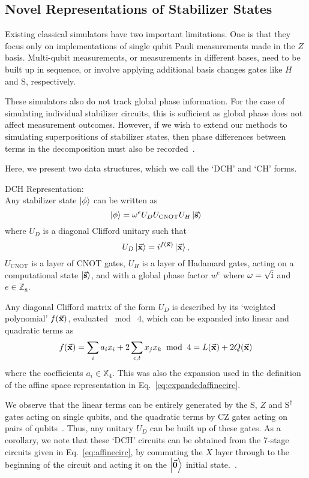 \subsection{Novel Representations of Stabilizer States}
Existing classical simulators have two important limitations. One is that they focus only on implementations of single qubit Pauli measurements made in the $Z$ basis. Multi-qubit measurements, or measurements in different bases, need to be built up in sequence, or involve applying additional basis changes gates like $H$ and S, respectively.\par
These simulators also do not track global phase information. For the case of simulating individual stabilizer circuits, this is sufficient as global phase does not affect measurement outcomes. However, if we wish to extend our methods to simulating superpositions of stabilizer states, then phase differences between terms in the decomposition must also be recorded~\cite{Garcia2015}.\par
Here, we present two data structures, which we call the `DCH' and `CH' forms.
\begin{defn}
DCH Representation:\\
Any stabilizer state $\ket{\phi}$ can be written as
\begin{equation}\ket{\phi} = \omega^{e}U_{D} U_{\text{CNOT}} U_{H} \ket{\va{s}}
\label{eq:dch}
\end{equation}
where $U_{D}$ is a diagonal Clifford unitary such that
\[
U_{D}\ket{\va{x}} = i^{f(\va{x})}\ket{\va{x}},
\]
$U_{\text{CNOT}}$ is a layer of CNOT gates, $U_{H}$ is a layer of Hadamard gates, acting on a computational state $\ket{\va{s}}$, and with a global phase factor $w^{e}$ where $\omega=\sqrt{\mathrm{i}}$ and $e\in\mathbb{Z}_{8}$.\label{def:dch}
\end{defn}
Any diagonal Clifford matrix of the form $U_{D}$ is described by its `weighted polynomial' $f(\va{x})$, evaluated $\bmod\; 4$, which can be expanded into linear and quadratic terms as~\cite{VandenNest2008,Campbell2016}
\[
    f(\va{x}) = \sum_{i}a_{i}x_{i} + 2\sum_{c,t}x_{j}x_{k}\;\bmod\;4 = L(\va{x}) + 2Q(\va{x})
\]
where the coefficients $a_{i}\in\mathbb{X}_{4}$. This was also the expansion used in the definition of the affine space representation in Eq.~\ref{eq:expandedaffinecirc}.\par
We observe that the linear terms can be entirely generated by the S, $Z$ and $\text{S}^{\dagger}$ gates acting on single qubits, and the quadratic terms by CZ gates acting on pairs of qubits~\cite{Campbell2016}. Thus, any unitary $U_{D}$ can be built up of these gates. As a corollary, we note that these `DCH' circuits can be obtained from the 7-stage circuits given in Eq.~\ref{eq:affinecirc}, by commuting the $X$ layer through to the beginning of the circuit and acting it on the $\ket{\va{0}}$ initial state.~\cite{VandenNest2008}.\par
